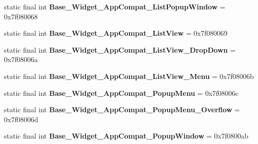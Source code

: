 \begin{DoxyCompactItemize}
\item 
\hypertarget{classandroid_1_1support_1_1design_1_1_r_1_1style_ad4b9f20b573cf189591167405c8d246d}{}static final int {\bfseries Base\+\_\+\+Widget\+\_\+\+App\+Compat\+\_\+\+List\+Popup\+Window} = 0x7f080068\label{classandroid_1_1support_1_1design_1_1_r_1_1style_ad4b9f20b573cf189591167405c8d246d}

\item 
\hypertarget{classandroid_1_1support_1_1design_1_1_r_1_1style_a13de35b0cfc641359585568fe72994fc}{}static final int {\bfseries Base\+\_\+\+Widget\+\_\+\+App\+Compat\+\_\+\+List\+View} = 0x7f080069\label{classandroid_1_1support_1_1design_1_1_r_1_1style_a13de35b0cfc641359585568fe72994fc}

\item 
\hypertarget{classandroid_1_1support_1_1design_1_1_r_1_1style_aa4d2f59a86c267ef24a3fb00d578f3ee}{}static final int {\bfseries Base\+\_\+\+Widget\+\_\+\+App\+Compat\+\_\+\+List\+View\+\_\+\+Drop\+Down} = 0x7f08006a\label{classandroid_1_1support_1_1design_1_1_r_1_1style_aa4d2f59a86c267ef24a3fb00d578f3ee}

\item 
\hypertarget{classandroid_1_1support_1_1design_1_1_r_1_1style_a9748000d54fe84d19a7f2ccad569c9bd}{}static final int {\bfseries Base\+\_\+\+Widget\+\_\+\+App\+Compat\+\_\+\+List\+View\+\_\+\+Menu} = 0x7f08006b\label{classandroid_1_1support_1_1design_1_1_r_1_1style_a9748000d54fe84d19a7f2ccad569c9bd}

\item 
\hypertarget{classandroid_1_1support_1_1design_1_1_r_1_1style_a6fc90d604807e924feefb0adf2a7d2cc}{}static final int {\bfseries Base\+\_\+\+Widget\+\_\+\+App\+Compat\+\_\+\+Popup\+Menu} = 0x7f08006c\label{classandroid_1_1support_1_1design_1_1_r_1_1style_a6fc90d604807e924feefb0adf2a7d2cc}

\item 
\hypertarget{classandroid_1_1support_1_1design_1_1_r_1_1style_a98001ced76638358f860dec36e44a24c}{}static final int {\bfseries Base\+\_\+\+Widget\+\_\+\+App\+Compat\+\_\+\+Popup\+Menu\+\_\+\+Overflow} = 0x7f08006d\label{classandroid_1_1support_1_1design_1_1_r_1_1style_a98001ced76638358f860dec36e44a24c}

\item 
\hypertarget{classandroid_1_1support_1_1design_1_1_r_1_1style_a49fc2bbb8931372170f422a8229577c2}{}static final int {\bfseries Base\+\_\+\+Widget\+\_\+\+App\+Compat\+\_\+\+Popup\+Window} = 0x7f0800ab\label{classandroid_1_1support_1_1design_1_1_r_1_1style_a49fc2bbb8931372170f422a8229577c2}


\end{DoxyCompactItemize}
